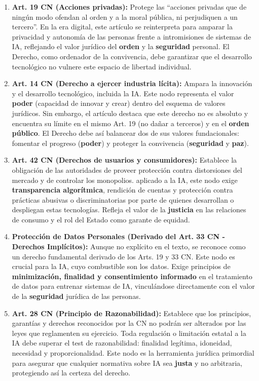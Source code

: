 \documentclass[11pt, a4paper]{article}
\begin{document}
\begin{enumerate}
    \item \textbf{Art. 19 CN (Acciones privadas):} Protege las ``acciones privadas que de ningún modo ofendan al orden y a la moral pública, ni perjudiquen a un tercero''. En la era digital, este artículo se reinterpreta para amparar la privacidad y autonomía de las personas frente a intromisiones de sistemas de IA, reflejando el valor jurídico del \textbf{orden} y la \textbf{seguridad} personal. El Derecho, como ordenador de la convivencia, debe garantizar que el desarrollo tecnológico no vulnere este espacio de libertad individual.

    \item \textbf{Art. 14 CN (Derecho a ejercer industria lícita):} Ampara la innovación y el desarrollo tecnológico, incluida la IA. Este nodo representa el valor \textbf{poder} (capacidad de innovar y crear) dentro del esquema de valores jurídicos. Sin embargo, el artículo destaca que este derecho no es absoluto y encuentra su límite en el mismo Art. 19 (no dañar a terceros) y en el \textbf{orden público}. El Derecho debe así balancear dos de sus valores fundacionales: fomentar el progreso (\textbf{poder}) y proteger la convivencia (\textbf{seguridad} y \textbf{paz}).

    \item \textbf{Art. 42 CN (Derechos de usuarios y consumidores):} Establece la obligación de las autoridades de proveer protección contra distorsiones del mercado y de controlar los monopolios. aplicado a la IA, este nodo exige \textbf{transparencia algorítmica}, rendición de cuentas y protección contra prácticas abusivas o discriminatorias por parte de quienes desarrollan o despliegan estas tecnologías. Refleja el valor de la \textbf{justicia} en las relaciones de consumo y el rol del Estado como garante de equidad.

    \item \textbf{Protección de Datos Personales (Derivado del Art. 33 CN - Derechos Implícitos):} Aunque no explícito en el texto, se reconoce como un derecho fundamental derivado de los Arts. 19 y 33 CN. Este nodo es crucial para la IA, cuyo combustible son los datos. Exige principios de \textbf{minimización, finalidad y consentimiento informado} en el tratamiento de datos para entrenar sistemas de IA, vinculándose directamente con el valor de la \textbf{seguridad} jurídica de las personas.

    \item \textbf{Art. 28 CN (Principio de Razonabilidad):} Establece que los principios, garantías y derechos reconocidos por la CN no podrán ser alterados por las leyes que reglamenten su ejercicio. Toda regulación o limitación estatal a la IA debe superar el test de razonabilidad: finalidad legítima, idoneidad, necesidad y proporcionalidad. Este nodo es la herramienta jurídica primordial para asegurar que cualquier normativa sobre IA sea \textbf{justa} y no arbitraria, protegiendo así la certeza del derecho.


\end{enumerate}
\end{document}
